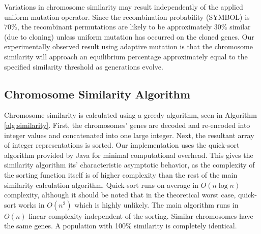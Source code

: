 \documentclass[conference]{IEEEtran}
\begin{document}
Variations in chromosome similarity may result independently of the applied uniform mutation operator. Since the recombination probability ({SYMBOL}) is 70\%, the recombinant permutations are likely to be approximately 30\% similar (due to cloning) unless uniform mutation has occurred on the cloned genes. Our experimentally observed result using adaptive mutation is that the chromosome similarity will approach an equilibrium percentage approximately equal to the specified similarity threshold as generations evolve.

\subsection{Chromosome Similarity Algorithm}
Chromosome similarity is calculated using a greedy algorithm, seen in Algorithm \ref{alg:similarity}. First, the chromosomes' genes are decoded and re-encoded into integer values and concatenated into one large integer. Next, the resultant array of integer representations is sorted. Our implementation uses the quick-sort algorithm provided by Java for minimal computational overhead. This gives the similarity algorithm its' characteristic asymptotic behavior, as the complexity of the sorting function itself is of higher complexity than the rest of the main similarity calculation algorithm. Quick-sort runs on average in $O(n \log n)$ complexity, although it should be noted that in the theoretical worst case, quick-sort works in $O(n^2)$ which is highly unlikely. The main algorithm runs in $O(n)$ linear complexity independent of the sorting. Similar chromosomes have the same genes. A population with 100\% similarity is completely identical.
\end{document}
